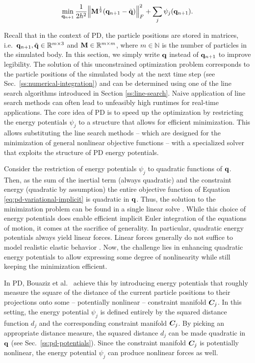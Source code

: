 \begin{equation}\label{eq:pd-variational-implicit}
    \min_{\mathbf{q}_{n+1}} \frac{1}{2h^2} \norm{\mathbf{M}^{\frac{1}{2}}(\mathbf{q}_{n+1} - \tilde{\mathbf{q}})}^2_F + \sum_j \psi_j(\mathbf{q}_{n+1}).
\end{equation}

\noindent Recall that in the context of PD, the particle positions are stored in matrices, i.e.\ $\mathbf{q}_{n+1}, \tilde{\mathbf{q}} \in 
\mathbb{R}^{m \times 3}$ and $\mathbf{M} \in \mathbb{R}^{m \times m}$, where $m \in \mathbb{N}$ is the number of particles in the simulated
body. In this section, we simply write $\mathbf{q}$ instead of $\mathbf{q}_{n+1}$ to improve legibility. The solution of this unconstrained 
optimization problem corresponds to the particle positions of the simulated body at the next time
step (see Sec.\ \ref{ss:numerical-integration}) and can be determined using one of the line search algorithms introduced in Section \ref{ss:line-search}.
Naive application of line search methods can often lead to unfeasibly high runtimes for real-time applications. The core idea of PD
is to speed up the optimization by restricting the energy potentials $\psi_j$ to a structure that allows for efficient minimization.
This allows substituting the line search methods -- which are designed for the minimization of general nonlinear objective functions 
-- with a specialized solver that exploits the structure of PD energy potentials. 

Consider the restriction of energy potentials $\psi_j$ to quadratic functions of $\mathbf{q}$. Then, as the sum of the inertial term 
(always quadratic) and the constraint energy (quadratic by assumption) the entire objective function of Equation \ref{eq:pd-variational-implicit} 
is quadratic in $\mathbf{q}$. Thus, the solution to the minimization problem can be found in a single linear solve \cite{nocedal2006}. 
While this choice
of energy potentials does enable efficient implicit Euler integration of the equations of motion, it comes at the sacrifice of generality.
In particular, quadratic energy potentials always yield linear forces. Linear forces generally do not suffice to model realistic
elastic behavior \cite{wang2011}. Now, the challenge lies in enhancing quadratic energy potentials to allow expressing some degree
of nonlinearity while still keeping the minimization efficient. 

In PD, Bouaziz et al.\ \cite{bouaziz2014} achieve this by introducing energy potentials that roughly measure the square of the
distance of the current particle positions to their projections onto some -- potentially nonlinear -- constraint manifold $\bm{C}_j$. 
In this setting, the energy potential $\psi_j$ is defined entirely by the squared distance function $d_j$ and the corresponding constraint 
manifold $\bm{C}_j$. By picking an appropriate distance measure, the squared distance $d_j$ can be made quadratic in $\mathbf{q}$ 
(see Sec.\ \ref{ss:pd-potentials}). Since the constraint manifold $\bm{C}_j$ is potentially nonlinear, the energy potential 
$\psi_j$ can produce nonlinear forces as well. 

